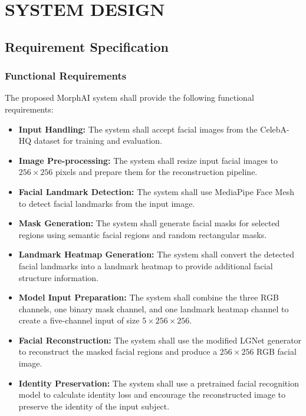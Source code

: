 \chapter{SYSTEM DESIGN}

\section{Requirement Specification}

\subsection{Functional Requirements}

The proposed MorphAI system shall provide the following functional requirements:

\begin{itemize}
\item \textbf{Input Handling:} The system shall accept facial images from the CelebA-HQ dataset for training and evaluation.

\item \textbf{Image Pre-processing:} The system shall resize input facial images to $256 \times 256$ pixels and prepare them for the reconstruction pipeline.

\item \textbf{Facial Landmark Detection:} The system shall use MediaPipe Face Mesh to detect facial landmarks from the input image.

\item \textbf{Mask Generation:} The system shall generate facial masks for selected regions using semantic facial regions and random rectangular masks.

\item \textbf{Landmark Heatmap Generation:} The system shall convert the detected facial landmarks into a landmark heatmap to provide additional facial structure information.

\item \textbf{Model Input Preparation:} The system shall combine the three RGB channels, one binary mask channel, and one landmark heatmap channel to create a five-channel input of size $5 \times 256 \times 256$.

\item \textbf{Facial Reconstruction:} The system shall use the modified LGNet generator to reconstruct the masked facial regions and produce a $256 \times 256$ RGB facial image.

\item \textbf{Identity Preservation:} The system shall use a pretrained facial recognition model to calculate identity loss and encourage the reconstructed image to preserve the identity of the input subject.


\end{itemize}
